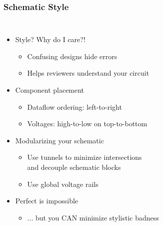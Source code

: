\documentclass{beamer}
\begin{document}
\begin{frame}
\frametitle{Schematic Style}
\begin{columns}[t]
\begin{itemize}
  \item Style? Why do I care?!
  \begin{itemize}
    \item Confusing designs hide errors
    \item Helps reviewers understand your circuit
  \end{itemize}
  \item Component placement
  \begin{itemize}
    \item Dataflow ordering: left-to-right
    \item Voltages: high-to-low on top-to-bottom
  \end{itemize}
  \item Modularizing your schematic
  \begin{itemize}
    \item Use tunnels to minimize intersections \\ and decouple schematic blocks
    \item Use global voltage rails
  \end{itemize}
  \item Perfect is impossible
  \begin{itemize}
    \item ... but you CAN minimize stylistic badness
  \end{itemize}
\end{itemize}


\end{columns}
\end{frame}
\end{document}
